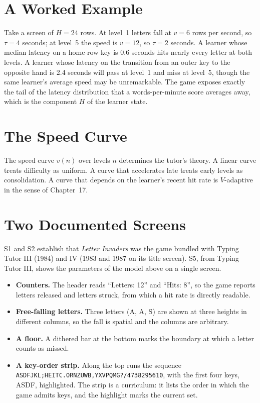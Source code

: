\section{A Worked Example}

Take a screen of $H=24$ rows. At level~1 letters fall at $v=6$ rows per second, so $\tau=4$ seconds; at level~5 the speed is $v=12$, so $\tau=2$ seconds. A learner whose median latency on a home-row key is 0.6 seconds hits nearly every letter at both levels. A learner whose latency on the transition from an outer key to the opposite hand is 2.4 seconds will pass at level~1 and miss at level~5, though the same learner's average speed may be unremarkable. The game exposes exactly the tail of the latency distribution that a words-per-minute score averages away, which is the component $H$ of the learner state.

\section{The Speed Curve}

The speed curve $v(n)$ over levels $n$ determines the tutor's theory. A linear curve treats difficulty as uniform. A curve that accelerates late treats early levels as consolidation. A curve that depends on the learner's recent hit rate is $V$-adaptive in the sense of Chapter~17. 

\section{Two Documented Screens}

S1 and S2 establish that \emph{Letter Invaders} was the game bundled with Typing Tutor III (1984) and IV (1983 and 1987 on its title screen). S5, from Typing Tutor III, shows the parameters of the model above on a single screen.

\begin{itemize}
\item \textbf{Counters.} The header reads ``Letters: 12'' and ``Hits: 8'', so the game reports letters released and letters struck, from which a hit rate is directly readable.
\item \textbf{Free-falling letters.} Three letters (A, A, S) are shown at three heights in different columns, so the fall is spatial and the columns are arbitrary.
\item \textbf{A floor.} A dithered bar at the bottom marks the boundary at which a letter counts as missed.
\item \textbf{A key-order strip.} Along the top runs the sequence \texttt{ASDFJKL;HEITC.ORNZUWB,YXVPQMG?/4738295610}, with the first four keys, ASDF, highlighted. The strip is a curriculum: it lists the order in which the game admits keys, and the highlight marks the current set. 
\end{itemize}

